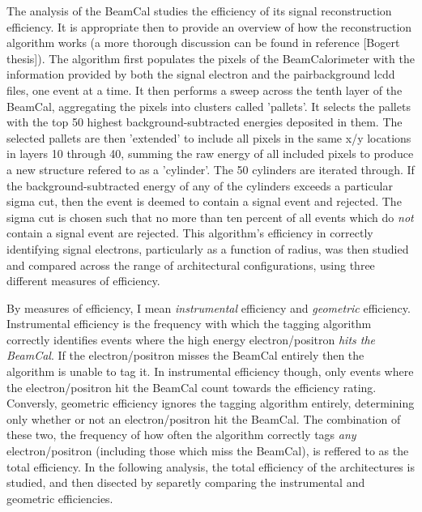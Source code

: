 \documentclass{report}
\begin{document}
            The analysis of the BeamCal studies the efficiency of its signal reconstruction efficiency. It is appropriate then to provide an overview of how the reconstruction algorithm works (a more thorough discussion can be found in reference [Bogert thesis]). The algorithm first populates the pixels of the BeamCalorimeter with the information provided by both the signal electron and the pairbackground lcdd files, one event at a time. It then performs a sweep across the tenth layer of the BeamCal, aggregating the pixels into clusters called 'pallets'. It selects the pallets with the top 50 highest background-subtracted energies deposited in them. The selected pallets are then 'extended' to include all pixels in the same x/y locations in layers 10 through 40, summing the raw energy of all included pixels to produce a new structure refered to as a 'cylinder'. The 50 cylinders are iterated through. If the background-subtracted energy of any of the cylinders exceeds a particular sigma cut, then the event is deemed to contain a signal event and rejected. The sigma cut is chosen such that no more than ten percent of all events which do \textit{not} contain a signal event are rejected. This algorithm's efficiency in correctly identifying signal electrons, particularly as a function of radius, was then studied and compared across the range of architectural configurations, using three different measures of efficiency.

            By measures of efficiency, I mean \textit{instrumental} efficiency and \textit{geometric} efficiency. Instrumental efficiency is the frequency with which the tagging algorithm correctly identifies events where the high energy electron/positron \textit{hits the BeamCal}. If the electron/positron misses the BeamCal entirely then the algorithm is unable to tag it. In instrumental efficiency though, only events where the electron/positron hit the BeamCal count towards the efficiency rating. Conversly, geometric efficiency ignores the tagging algorithm entirely, determining only whether or not an electron/positron hit the BeamCal. The combination of these two, the frequency of how often the algorithm correctly tags \textit{any} electron/positron (including those which miss the BeamCal), is reffered to as the total efficiency. In the following analysis, the total efficiency of the architectures is studied, and then disected by separetly comparing the instrumental and geometric efficiencies.
\end{document}

